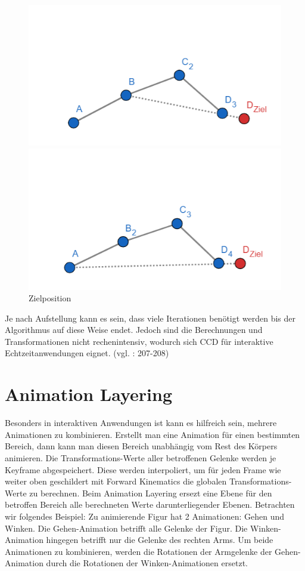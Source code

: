 \begin{figure}[!htb]
	\includegraphics[width=\linewidth]{img/ccd_2.png}
	\caption{}\label{fig:ccd_2}
	\endminipage\hfill
	\includegraphics[width=\linewidth]{img/ccd_3.png}
	\caption{Zielposition}\label{fig:ccd_3}
	\endminipage\hfill
\end{figure}
Je nach Aufstellung kann es sein, dass viele Iterationen benötigt werden bis der Algorithmus auf diese Weise endet. Jedoch sind die Berechnungen und Transformationen nicht rechenintensiv, wodurch sich CCD für interaktive Echtzeitanwendungen eignet. (vgl. \cite{Fedor2003}: 207-208)
%
\section{Animation Layering}
%
Besonders in interaktiven Anwendungen ist kann es hilfreich sein, mehrere Animationen zu kombinieren. Erstellt man eine Animation für einen bestimmten Bereich, dann kann man diesen Bereich unabhängig vom Rest des Körpers animieren. Die Transformations-Werte aller betroffenen Gelenke werden je Keyframe abgespeichert. Diese werden interpoliert, um für jeden Frame wie weiter oben geschildert mit Forward Kinematics die globalen Transformations-Werte zu berechnen. Beim Animation Layering ersezt eine Ebene für den betroffen Bereich alle berechneten Werte darunterliegender Ebenen.
\newline\newline
Betrachten wir folgendes Beispiel: \newline
Zu animierende Figur hat 2 Animationen: Gehen und Winken. Die Gehen-Animation betrifft alle Gelenke der Figur. Die Winken-Animation hingegen betrifft nur die Gelenke des rechten Arms. Um beide Animationen zu kombinieren, werden die Rotationen der Armgelenke der Gehen-Animation durch die Rotationen der Winken-Animationen ersetzt.
%
